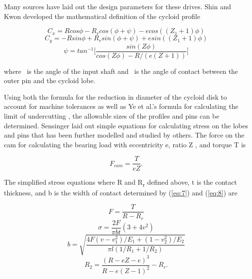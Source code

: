 \documentclass[letterpaper, 10 pt, conference]{ieeeconf}  %
\begin{document}
Many sources have laid out the design parameters for these drives. Shin and Kwon developed the mathematical definition of the cycloid profile

\begin{equation} \label{eq:1}
C_x = R cos\phi -R_r cos(\phi + \psi) - e cos((Z_1 + 1)\phi) 
\end{equation}
\begin{equation} \label{eq:2}
C_y = -R sin\phi + R_r sin(\phi + \psi) + e sin((Z_1 + 1)\phi) 
\end{equation}
\begin{equation} \label{eq:3}
\psi = tan^{-1} \lbrack\frac{sin(Z \phi)}{cos(Z \phi) - R / (e(Z + 1))}\rbrack 
\end{equation}

where \textphi\ is the angle of the input shaft and \textpsi\ is the angle of contact between the outer pin and the cycloid lobe. 

Using both the formula for the reduction in diameter of the cycloid disk to account for machine tolerances \cite{machine_design} \cite{design_and_application} as well as Ye et al.'s formula for calculating the limit of undercutting \cite{ye}, the allowable sizes of the profiles and pins can be determined. Sensinger \cite{unified_approach} laid out simple equations for calculating stress on the lobes and pins that has been further modelled and studied by others. The force on the cam for calculating the bearing load with eccentricity e, ratio Z , and torque T is

\begin{equation} \label{eq:4}
F_{cam} = \frac{T}{e Z}.
\end{equation}

The simplified stress equations where R and R\textsubscript{r} defined above, t is the contact thickness, and b is the width of contact determined by (\ref{eq:7}) and (\ref{eq:8}) are

\begin{equation} \label{eq:5}
F = \frac{T}{R - R_r}
\end{equation}
\begin{equation} \label{eq:6}
\sigma = \frac{2F}{\pi b t} (3 + 4v^2)
\end{equation}
\begin{equation} \label{eq:7}
b = \sqrt{\frac{4F (v-v_1^2) /E_1 + (1 - v_2^2)/E_2}{\pi l (1/R_1 + 1/R_2)}}
\end{equation}
\begin{equation} \label{eq:8}
R_2 = \frac{(R-eZ - e)^3}{R-e(Z-1)^2} - R_r.
\end{equation}
\end{document}

